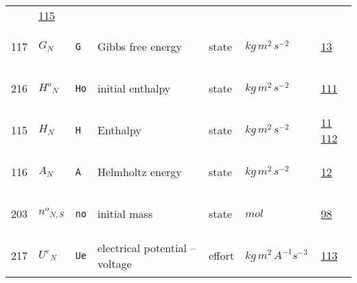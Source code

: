 \begin{longtable}{|p{1cm}|p{2.5cm}|p{4.5cm}|p{8cm}|p{3.0cm}|p{3cm}|p{1cm}|}
             &                 \hyperlink{"e:115"}{ 115 }
                 \\
            117
             & \hypertarget{"v:117"}{ $ {G}{_{N}} $}
             & \verb|G|
             & Gibbs free energy
             & \begin{lay}state \end{lay}
             & $ kg \,m^{2} \,s^{-2} \, $
             &                 \hyperlink{"e:13"}{ 13 }
                 \\
            216
             & \hypertarget{"v:216"}{ $ {{H^o}}{_{N}} $}
             & \verb|Ho|
             & initial enthalpy
             & \begin{lay}state \end{lay}
             & $ kg \,m^{2} \,s^{-2} \, $
             &                 \hyperlink{"e:111"}{ 111 }
                 \\
            115
             & \hypertarget{"v:115"}{ $ {H}{_{N}} $}
             & \verb|H|
             & Enthalpy
             & \begin{lay}state \end{lay}
             & $ kg \,m^{2} \,s^{-2} \, $
             &                 \hyperlink{"e:11"}{ 11 }
                                 \hyperlink{"e:112"}{ 112 }
                 \\
            116
             & \hypertarget{"v:116"}{ $ {A}{_{N}} $}
             & \verb|A|
             & Helmholtz energy
             & \begin{lay}state \end{lay}
             & $ kg \,m^{2} \,s^{-2} \, $
             &                 \hyperlink{"e:12"}{ 12 }
                 \\
            203
             & \hypertarget{"v:203"}{ $ {{n^o}}{_{N, S}} $}
             & \verb|no|
             & initial mass
             & \begin{lay}state \end{lay}
             & $ mol \, $
             &                 \hyperlink{"e:98"}{ 98 }
                 \\
            217
             & \hypertarget{"v:217"}{ $ {{U^e}}{_{N}} $}
             & \verb|Ue|
             & electrical potential -- voltage
             & \begin{lay}effort \end{lay}
             & $ kg \,m^{2} \,A^{-1} s^{-3} \, $
             &                 \hyperlink{"e:113"}{ 113 }
                 \\

\end{longtable}

